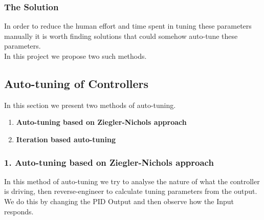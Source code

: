 \documentclass[a4paper,12pt,oneside]{book}
\begin{document}
\subsubsection{\textbf{The Solution}}
In order to reduce the human effort and time spent in tuning these parameters manually it is worth finding solutions that could somehow auto-tune these parameters.\\
In this project we propose two such methods.\\

\subsection{Auto-tuning of Controllers}
In this section we present two methods of auto-tuning.
\begin{enumerate}
    \item \textbf{Auto-tuning based on Ziegler-Nichols approach  }
    \item\textbf{Iteration based auto-tuning}
\end{enumerate}

\subsubsection{1. Auto-tuning based on Ziegler-Nichols approach}
In this method of auto-tuning we try to analyse the nature of what the controller is driving, then reverse-engineer to calculate tuning parameters from the output.\\
We do this by  changing the PID Output and then observe how the Input responds.
\end{document}

